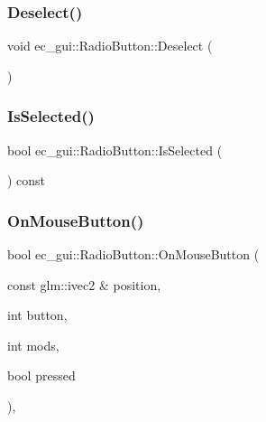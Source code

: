\subsubsection{\texorpdfstring{Deselect()}{Deselect()}}
{\footnotesize\ttfamily void ec\+\_\+gui\+::\+Radio\+Button\+::\+Deselect (\begin{DoxyParamCaption}{ }\end{DoxyParamCaption})\hspace{0.3cm}{\ttfamily [protected]}}

\mbox{\label{classec__gui_1_1_radio_button_a6c22c63444d84d52678fcd05d9bd6822}} 
\subsubsection{\texorpdfstring{Is\+Selected()}{IsSelected()}}
{\footnotesize\ttfamily bool ec\+\_\+gui\+::\+Radio\+Button\+::\+Is\+Selected (\begin{DoxyParamCaption}{ }\end{DoxyParamCaption}) const}

\mbox{\label{classec__gui_1_1_radio_button_a40837f7fe8a630e42a2c8778689f2463}} 
\subsubsection{\texorpdfstring{On\+Mouse\+Button()}{OnMouseButton()}}
{\footnotesize\ttfamily bool ec\+\_\+gui\+::\+Radio\+Button\+::\+On\+Mouse\+Button (\begin{DoxyParamCaption}\item[{const glm\+::ivec2 \&}]{position,  }\item[{int}]{button,  }\item[{int}]{mods,  }\item[{bool}]{pressed }\end{DoxyParamCaption})\hspace{0.3cm}{\ttfamily [override]}, {\ttfamily [virtual]}}



